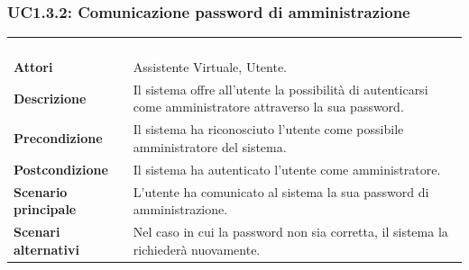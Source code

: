 \subsubsection{UC1.3.2: Comunicazione password di amministrazione}
\label{UC1.3.2}
\begin{longtable}{l|p{10cm}}
\rowcolor[gray]{0.8} \multicolumn{2}{c}{} \\
\rowcolor[gray]{0.8} \multicolumn{2}{c}{\textbf{UC1.3.2 - Comunicazione password di amministrazione}} \\
\rowcolor[gray]{0.8} \multicolumn{2}{c}{} \\
\hline
&\\
\textbf{Attori} & Assistente Virtuale, Utente.\\[7pt]
\textbf{Descrizione} & Il sistema offre all'utente la possibilità di autenticarsi come amministratore attraverso la sua password.\\[7pt]
\textbf{Precondizione} & Il sistema ha riconosciuto l'utente come possibile amministratore del sistema.\\[7pt]
\textbf{Postcondizione} & Il sistema ha autenticato l'utente come amministratore.\\[7pt]
\textbf{Scenario principale} &L'utente ha comunicato al sistema la sua password di amministrazione.\\[7pt]
\textbf{Scenari alternativi} & Nel caso in cui la password non sia corretta, il sistema la richiederà nuovamente.\\[7pt]\hline
\end{longtable}

